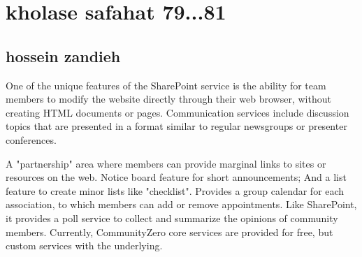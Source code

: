 \documentclass [12pt]{beamer}
\begin{document}
\section*{kholase safahat 79...81}
\subsection*{hossein zandieh  }	
\begin{frame}
\justifying	
One of the unique features of the SharePoint service is the ability for team members to modify the website directly through their web browser, without creating HTML documents or pages.  Communication services include discussion topics that are presented in a format similar to regular newsgroups or presenter conferences.
\end{frame}

\begin{frame}
\justifying	
A "partnership" area where members can provide marginal links to sites or resources on the web.  Notice board feature for short announcements;  And a list feature to create minor lists like "checklist".
Provides a group calendar for each association, to which members can add or remove appointments.  Like SharePoint, it provides a poll service to collect and summarize the opinions of community members.  Currently, CommunityZero core services are provided for free, but custom services with the underlying. 
\end{frame}
\end{document}
